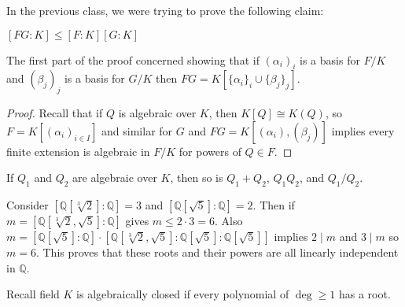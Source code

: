 \documentclass[a4paper,twoside,master.tex]{subfiles}
\begin{document}

In the previous class, we were trying to prove the following claim:
\begin{claim}
    $ [FG \colon K] \leq [F \colon K][G \colon K] $
\end{claim}
The first part of the proof concerned showing that if $ (\alpha_{i})_{i} $ is a basis for $ F / K $ and $ (\beta_{j})_{j} $ is a basis for $ G / K $ then $ FG = K[\{\alpha_{i}\}_{i} \cup \{\beta_{j}\}_{j} ] $.

\begin{proof}
    Recall that if $ Q $ is algebraic over $ K $, then $ K[Q] \cong K(Q) $, so $ F = K[(\alpha_{i})_{i\in I}] $ and similar for $ G $ and $ FG = K[(\alpha_{i}),(\beta_{j})]  $ implies every finite extension is algebraic in $ F / K $ for powers of $ Q\in F $.
\end{proof}
\begin{corollary}
    If $ Q_1 $ and $ Q_2 $ are algebraic over $ K $, then so is $ Q_1+Q_2 $, $ Q_1Q_2 $, and $ Q_1 / Q_2 $.
\end{corollary}
\begin{ex}
    Consider $ [\mathbb{Q}[\sqrt[3]{2}] \colon \mathbb{Q}] = 3 $ and $ [\mathbb{Q}[\sqrt{5}] \colon \mathbb{Q}] = 2 $. Then if  $ m = [\mathbb{Q}[\sqrt[3]{2}, \sqrt{5}] \colon \mathbb{Q}] $ gives $ m \leq 2 \cdot 3 = 6 $. Also $ m = [\mathbb{Q}[\sqrt{5}] \colon \mathbb{Q}] \cdot [\mathbb{Q}[\sqrt[3]{2},\sqrt{5}] \colon \mathbb{Q}[\sqrt{5}] \colon \mathbb{Q}[\sqrt{5}]] $ implies $ 2 \mid m $ and $ 3 \mid m $ so $ m=6 $. This proves that these roots and their powers are all linearly independent in $ \mathbb{Q} $.
\end{ex}

Recall field $ K $ is algebraically closed if every polynomial of $ \deg \geq 1 $ has a root.
\end{document}
